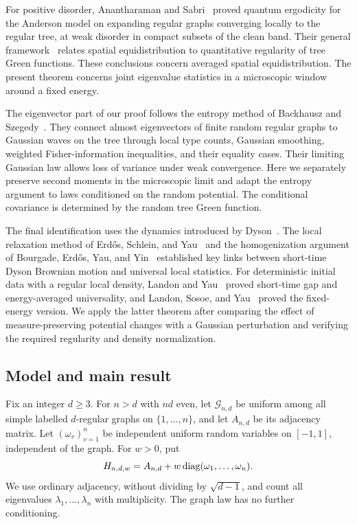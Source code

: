 For positive disorder, Anantharaman and
Sabri~\cite{AnantharamanSabri2017} proved quantum ergodicity for the
Anderson model on expanding regular graphs converging locally to the
regular tree, at weak disorder in compact subsets of the clean band.
Their general framework~\cite{AnantharamanSabri2019} relates spatial
equidistribution to quantitative regularity of tree Green functions.
These conclusions concern averaged spatial equidistribution.  The
present theorem concerns joint eigenvalue statistics in a microscopic
window around a fixed energy.

The eigenvector part of our proof follows the entropy method of
Backhausz and Szegedy~\cite{BackhauszSzegedy2019}.  They connect almost
eigenvectors of finite random regular graphs to Gaussian waves on the
tree through local type counts, Gaussian smoothing, weighted
Fisher-information inequalities, and their equality cases.  Their
limiting Gaussian law allows loss of variance under weak convergence.
Here we separately preserve second moments in the microscopic limit
and adapt the entropy argument to laws conditioned on the random
potential.  The conditional covariance is determined by the random tree Green
function.

The final identification uses the dynamics introduced by
Dyson~\cite{Dyson1962}.  The local relaxation method of Erd\H{o}s,
Schlein, and Yau~\cite{ESY2011} and the homogenization argument of
Bourgade, Erd\H{o}s, Yau, and Yin~\cite{BEYY2016} established key links
between short-time Dyson Brownian motion and universal local statistics.
For deterministic initial data with a regular local density, Landon and
Yau~\cite{LandonYau2017} proved short-time gap and energy-averaged
universality, and Landon, Sosoe, and Yau~\cite{LSY2019} proved the
fixed-energy version.  We apply the latter theorem after comparing
the effect of measure-preserving potential changes with a Gaussian
perturbation and verifying the required regularity and density
normalization.

\subsection{Model and main result}

Fix an integer $d\ge3$.  For $n>d$ with $nd$ even, let
$\mathcal G_{n,d}$ be uniform among all simple labelled $d$-regular
graphs on $\{1,\ldots,n\}$, and let $A_{n,d}$ be its adjacency matrix.
Let $(\omega_v)_{v=1}^n$ be independent uniform random variables on
$[-1,1]$, independent of the graph.  For $w>0$, put
\[
 H_{n,d,w}=A_{n,d}+w\operatorname{diag}(\omega_1,\ldots,\omega_n).
\]
We use ordinary adjacency, without dividing by $\sqrt{d-1}$, and count
all eigenvalues $\lambda_1,\ldots,\lambda_n$ with multiplicity.
The graph law has no further conditioning.

